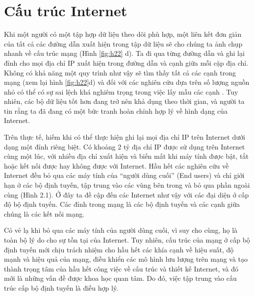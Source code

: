 \section{Cấu trúc Internet}
Khi một người có một tập hợp dữ liệu theo dõi phù hợp, một liên kết đơn giản của tất cả các đường dẫn xuất hiện trong tập dữ liệu sẽ cho chúng ta ảnh chụp nhanh về cấu trúc mạng (Hình \ref{fig:h22} d). Ta đi qua từng đường dẫn và ghi lại đỉnh cho mọi địa chỉ IP xuất hiện trong đường dẫn và cạnh giữa mỗi cặp địa chỉ. Không có khả năng một quy trình như vậy sẽ tìm thấy tất cả các cạnh trong mạng (xem lại hình \ref{fig:h22}d) và đối với các nghiên cứu dựa trên số lượng nguồn nhỏ có thể có sự sai lệch khá nghiêm trọng trong việc lấy mẫu các cạnh . Tuy nhiên, các bộ dữ liệu tốt hơn đang trở nên khả dụng theo thời gian, và người ta tin rằng ta đã đang có một bức tranh hoàn chỉnh hợp lý về hình dạng của Internet.\par
Trên thực tế, hiếm khi có thể thực hiện ghi lại mọi địa chỉ IP trên Internet dưới dạng một đỉnh riêng biệt. Có khoảng 2 tỷ địa chỉ IP được sử dụng trên Internet cùng một lúc, với nhiều địa chỉ xuất hiện và biến mất khi máy tính được bật, tắt hoặc kết nối được hay không được với Internet. Hầu hết các nghiên cứu về Internet đều bỏ qua các máy tính của “người dùng cuối” (End users) và chỉ giới hạn ở các bộ định tuyến, tập trung vào các vùng bên trong và bỏ qua phần ngoài cùng (Hình 2.1). Ở đây ta đề cập đến các Internet như vậy với các đại diện ở cấp độ bộ định tuyến. Các đỉnh trong mạng là các bộ định tuyến và các cạnh giữa chúng là các kết nối mạng.\par
Có vẻ lạ khi bỏ qua các máy tính của người dùng cuối, vì suy cho cùng, họ là toàn bộ lý do cho sự tồn tại của Internet. Tuy nhiên, cấu trúc của mạng ở cấp bộ định tuyến mới chịu trách nhiệm cho hầu hết các khía cạnh về hiệu suất, độ mạnh và hiệu quả của mạng, điều khiển các mô hình lưu lượng trên mạng và tạo thành trọng tâm của hầu hết công việc về cấu trúc và thiết kế Internet, và đó mới là những vấn đề được khoa học quan tâm. Do đó, việc tập trung vào cấu trúc cấp bộ định tuyến là điều hợp lý.\par
